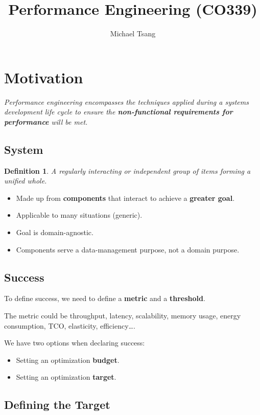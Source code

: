 \documentclass[11pt]{article}
\title{Performance Engineering (CO339)}
\author{Michael Tsang}
\newtheorem{defn}{Definition}
\begin{document}
\maketitle

\section{Motivation}
\textit{Performance engineering encompasses the techniques applied during a systems development life cycle to ensure the \textbf{non-functional requirements for performance} will be met.}

\subsection{System}
\begin{defn}
  A regularly interacting or independent group of items forming a unified whole.
\end{defn}

\begin{itemize}
  \item Made up from \textbf{components} that interact to achieve a \textbf{greater goal}.
  \item Applicable to many situations (generic).
  \item Goal is domain-agnostic.
  \item Components serve a data-management purpose, not a domain purpose.
\end{itemize}

\subsection{Success}
To define success, we need to define a \textbf{metric} and a \textbf{threshold}.

The metric could be throughput, latency, scalability, memory usage, energy consumption, TCO, elasticity, efficiency\dots.

We have two options when declaring success:
\begin{itemize}
  \item Setting an optimization \textbf{budget}.
  \item Setting an optimization \textbf{target}.
\end{itemize}

\subsection{Defining the Target}
\end{document}
